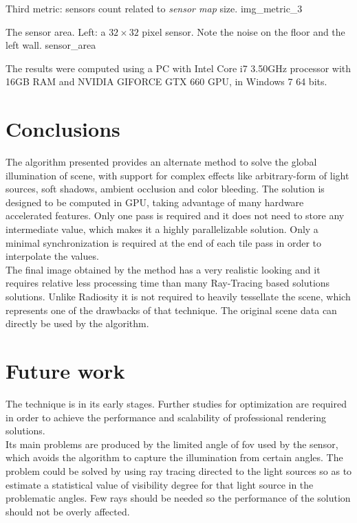 \documentclass[10pt, conference]{IEEEtran}
\begin{document}
\subimages
	{Third metric: sensors count related to \emph{sensor map} size.}
	{img_metric_3}{
}


\subimages
	{The sensor area. Left: a $32 \times 32$ pixel sensor. Note the noise on the floor and the left wall.}
	{sensor_area}{
}

The results were computed using a PC with Intel Core i7 3.50GHz processor with 16GB RAM and NVIDIA GIFORCE GTX 660 GPU, in Windows 7 64 bits.


\section{Conclusions}
%
The algorithm presented provides an alternate method to solve the global illumination of scene, with support for complex effects like arbitrary-form of light sources, soft shadows, ambient occlusion and color bleeding. 
The solution is designed to be computed in GPU, taking advantage of many hardware accelerated features. 
Only one pass is required and it does not need to store any intermediate value, which makes it a highly parallelizable solution. 
Only a minimal synchronization is required at the end of each tile pass in order to interpolate the values.\\

The final image obtained by the method has a very realistic looking and it requires relative less processing time than many Ray-Tracing based solutions \cite{ray_tracing} solutions.
Unlike Radiosity it is not required to heavily tessellate the scene, which represents one of the drawbacks of that technique. 
The original scene data can directly be used by the algorithm.


\section{Future work}
%
The technique is in its early stages. Further studies for optimization are required in order to achieve the performance and scalability of professional rendering solutions.\\

Its main problems are produced by the limited angle of fov used by the sensor, which avoids the algorithm to capture the illumination from certain angles. 
The problem could be solved by using ray tracing directed to the light sources so as to estimate a statistical value of visibility degree for that light source in the problematic angles. 
Few rays should be needed so the performance of the solution should not be overly affected.\\
\end{document}
